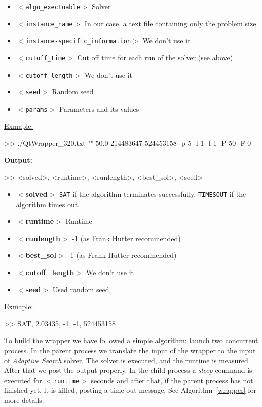 \begin{itemize}
	\item \texttt{$<$algo\_exectuable$>$} Solver 
	\item \texttt{$<$instance\_name$>$} In our case, a text file containing only the problem size
	\item \texttt{$<$instance-specific\_information$>$} We don't use it 
	\item \texttt{$<$cutoff\_time$>$} Cut off time for each run of the solver (see above)
	\item \texttt{$<$cutoff\_length$>$} We don't use it
	\item \texttt{$<$seed$>$} Random seed
	\item \texttt{$<$params$>$} Parameters and its values
\end{itemize}

\underline{Exmaple:}

\begin{BGVerbatim}
>> ./QtWrapper_320.txt "" 50.0 214483647 524453158 -p 5 -l 1 -f 1 -P 50 -F 0
\end{BGVerbatim}

\textbf{\large Output:} 

\begin{BGVerbatim}
>> <solved>, <runtime>, <runlength>, <best_sol>, <seed>
\end{BGVerbatim}

\begin{itemize}
	\item {\bf $<$solved$>$} \texttt{SAT} if the algorithm terminates successfully. \texttt{TIMESOUT} if the algorithm times out.
	\item {\bf $<$runtime$>$} Runtime
	\item {\bf $<$runlength$>$} -1 (as Frank Hutter recommended)
	\item {\bf $<$best\_sol$>$} -1 (as Frank Hutter recommended)
	\item {\bf $<$cutoff\_length$>$} We don't use it
	\item {\bf $<$seed$>$} Used random seed
\end{itemize}

\underline{Exmaple:}

\begin{BGVerbatim}
>> SAT, 2.03435, -1, -1, 524453158
\end{BGVerbatim}

To build the wrapper we have followed a simple algorithm: launch two concurrent process. In the parent process we translate the input of the wrapper to the input of {\it Adaptive Search} solver. The solver is executed, and the runtime is measured. After that we post the output properly. In the child process a {\it sleep} command is executed for \texttt{$<$runtime$>$} seconds and after that, if the parent process has not finished yet, it is killed, posting a time-out message. See Algorithm~\ref{wrapper} for more details.

